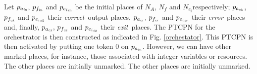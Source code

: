Let $p_{a_{\it in}}$, $p_{f_{\it in}}$ and $p_{{e_i}_{\it in}}$ be the initial places of
$N_A$, $N_f$ and $N_{e_i}$respectively; $p_{a_{\it ok}}$, $p_{f_{\it ok}}$ and $p_{{e_i}_{\it ok}}$ their {\em correct}\, output places, $p_{a_{\it er}},\, p_{f_{\it
er}}$ and $p_{{e_i}_{\it er}}$ their {\em error}\, places and, finally, $p_{a_{\it ex}},\, p_{f_{\it ex}}$ and $p_{{e_i}_{\it ex}}$ their {\em exit}\, places. The PTCPN for the
orchestrator is then constructed as indicated in Fig. \ref{orchestator}. This PTCPN is then activated by putting one token
$0$ on $p_{a_{\it in}}$. However, we can have other marked places, 
for instance, those associated with integer
variables or resources. The other places are initially unmarked.
%
%
%
%
%
%
%
The other places are initially unmarked.


